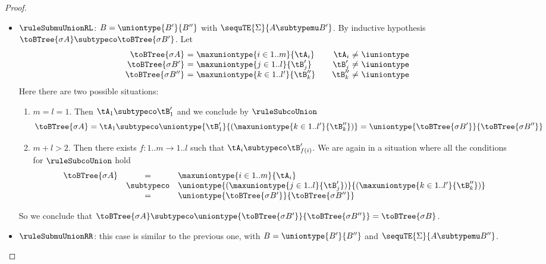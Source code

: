 \begin{proof}
\begin{itemize}
  \item $\ruleSubmuUnionRL$: $B = \uniontype{B'}{B''}$ with $\sequTE{\Sigma}{A
  \subtypemu B'}$. By inductive hypothesis $\toBTree{\sigma A} \subtypeco
  \toBTree{\sigma B'}$. Let $$
\begin{array}{r@{\ =\ }l@{\qquad}r@{\ \neq\ }l}
\toBTree{\sigma A}   & \maxuniontype{i \in 1..m}{\tA_i}    & \tA_i   & \iuniontype \\
\toBTree{\sigma B'}  & \maxuniontype{j \in 1..l}{\tB'_j}   & \tB'_j  & \iuniontype \\
\toBTree{\sigma B''} & \maxuniontype{k \in 1..l'}{\tB''_k} & \tB''_k & \iuniontype
\end{array} $$
Here there are two possible situations:
  \begin{enumerate}
    \item $m = l = 1$. Then $\tA_1 \subtypeco \tB'_1$ and we conclude by
    $\ruleSubcoUnion$ $$\toBTree{\sigma A} = \tA_1 \subtypeco
    \uniontype{\tB'_1}{(\maxuniontype{k \in 1..l'}{\tB''_k})} =
    \uniontype{\toBTree{\sigma B'}}{\toBTree{\sigma B''}}$$
    \item $m + l > 2$. Then there exists $f : 1..m \to 1..l$ such that $\tA_i
    \subtypeco \tB'_{f(i)}$. We are again in a situation where all the
    conditions for $\ruleSubcoUnion$ hold $$
\begin{array}{rcl}
\toBTree{\sigma A} & =          & \maxuniontype{i \in 1..m}{\tA_i} \\
                   & \subtypeco & \uniontype{(\maxuniontype{j \in 1..l}{\tB'_j})}{(\maxuniontype{k \in 1..l'}{\tB''_k})} \\
                   & =          & \uniontype{\toBTree{\sigma B'}}{\toBTree{\sigma B''}}
\end{array} $$
  \end{enumerate}
  So we conclude that $\toBTree{\sigma A} \subtypeco \uniontype{\toBTree{\sigma B'}}{\toBTree{\sigma B''}} = \toBTree{\sigma B}$.
  
  \item $\ruleSubmuUnionRR$: this case is similar to the previous one, with
  $B = \uniontype{B'}{B''}$ and $\sequTE{\Sigma}{A \subtypemu B''}$.
  

\end{itemize}
\end{proof}
